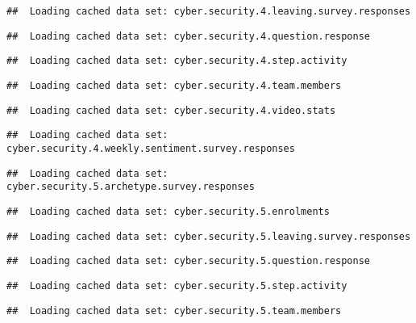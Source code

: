 \documentclass[]{article}
\begin{document}
\begin{verbatim}
##  Loading cached data set: cyber.security.4.leaving.survey.responses
\end{verbatim}

\begin{verbatim}
##  Loading cached data set: cyber.security.4.question.response
\end{verbatim}

\begin{verbatim}
##  Loading cached data set: cyber.security.4.step.activity
\end{verbatim}

\begin{verbatim}
##  Loading cached data set: cyber.security.4.team.members
\end{verbatim}

\begin{verbatim}
##  Loading cached data set: cyber.security.4.video.stats
\end{verbatim}

\begin{verbatim}
##  Loading cached data set: cyber.security.4.weekly.sentiment.survey.responses
\end{verbatim}

\begin{verbatim}
##  Loading cached data set: cyber.security.5.archetype.survey.responses
\end{verbatim}

\begin{verbatim}
##  Loading cached data set: cyber.security.5.enrolments
\end{verbatim}

\begin{verbatim}
##  Loading cached data set: cyber.security.5.leaving.survey.responses
\end{verbatim}

\begin{verbatim}
##  Loading cached data set: cyber.security.5.question.response
\end{verbatim}

\begin{verbatim}
##  Loading cached data set: cyber.security.5.step.activity
\end{verbatim}

\begin{verbatim}
##  Loading cached data set: cyber.security.5.team.members
\end{verbatim}
\end{document}
